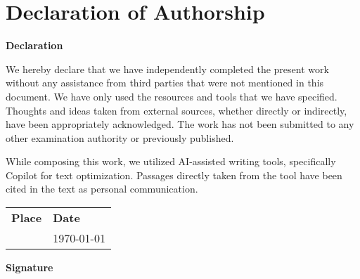 \section{Declaration of Authorship}
\vspace{0.8cm}
\textbf{Declaration}\

We hereby declare that we have independently completed the present work without any assistance from third parties that were not mentioned in this document. We have only used the resources and tools that we have specified. Thoughts and ideas taken from external sources, whether directly or indirectly, have been appropriately acknowledged. The work has not been submitted to any other examination authority or previously published.\

While composing this work, we utilized AI-assisted writing tools, specifically Copilot for text optimization. Passages directly taken from the tool have been cited in the text as personal communication.
\vspace{0.8cm}\

\begin{tabular}{l l}
	\textbf{Place} & \textbf{Date} \\
	\Place & \today
\end{tabular}
\vspace{0.8cm}

\textbf{Signature}\
\vspace{0.2cm}
\AuthorOne \hspace{4cm} \AuthorTwo

\clearpage

